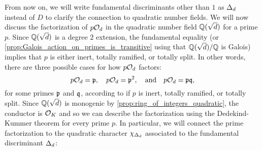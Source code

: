     From now on, we will write fundamental discriminants other than $1$ as $\Delta_{d}$ instead of $D$ to clarify the connection to quadratic number fields. We will now discuss the factorization of $p\mathcal{O}_{d}$ in the quadratic number field $\mathbb{Q}(\sqrt{d})$ for a prime $p$. Since $\mathbb{Q}(\sqrt{d})$ is a degree $2$ extension, the fundamental equality (or \cref{prop:Galois_action_on_primes_is_transitive} using that $\mathbb{Q}(\sqrt{d})/\mathbb{Q}$ is Galois) implies that $p$ is either inert, totally ramified, or totally split. In other words, there are three possible cases for how $p\mathcal{O}_{d}$ factors:
    \[
      p\mathcal{O}_{d} = \mathfrak{p}, \quad p\mathcal{O}_{d} = \mathfrak{p}^{2}, \quad \text{and} \quad p\mathcal{O}_{d} = \mathfrak{p}\mathfrak{q},
    \]
    for some primes $\mathfrak{p}$ and $\mathfrak{q}$, according to if $p$ is inert, totally ramified, or totally split. Since $\mathbb{Q}(\sqrt{d})$ is monogenic by \cref{prop:ring_of_integers_quadratic}, the conductor is $\mathcal{O}_{K}$ and so we can describe the factorization using the Dedekind-Kummer theorem for every prime $p$. In particular, we will connect the prime factorization to the quadratic character $\chi_{\Delta_{d}}$ associated to the fundamental discriminant $\Delta_{d}$:


